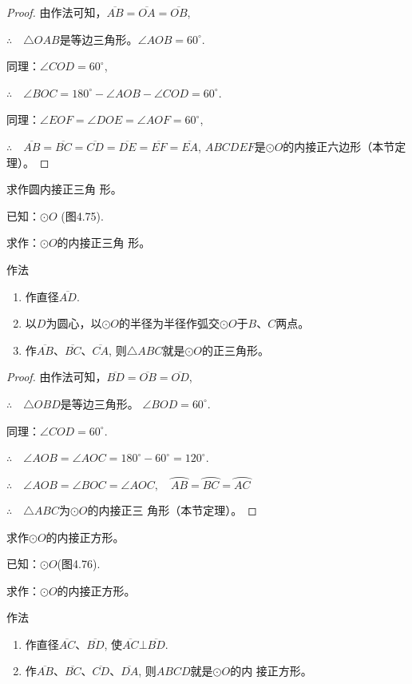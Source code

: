 \begin{proof}
由作法可知，$\overline{AB}=\overline{OA}=\overline{OB}$, 

$\therefore\quad \triangle OAB$是等边三角形。$\angle AOB=60^{\circ}$.

同理：$\angle COD=60^{\circ}$,

$\therefore\quad \angle BOC=180^{\circ}-\angle AOB-\angle COD=60^{\circ}$.

同理：$\angle EOF=\angle DOE=\angle AOF=60^{\circ}$, 

$\therefore\quad \overline{AB}=\overline{BC}=\overline{CD}=\overline{DE}=\overline{EF}=\overline{EA}$, 
$ABCDEF$是$\odot O$的内接正六边形（本节定理）。
\end{proof}

\begin{example}
  求作圆内接正三角
  形。

  已知：$\odot O$ (图4.75).

  求作：$\odot O$的内接正三角
  形。

  作法
\begin{enumerate}
  \item 作直径$\overline{AD}$.
  \item 以$D$为圆心，以$\odot O$的半径为半径作弧交$\odot O$于$B$、$C$两点。
  \item 作$\overline{AB}$、$\overline{BC}$、$\overline{CA}$, 则$\triangle ABC$就是$\odot O$的正三角形。
\end{enumerate}
\end{example}

\begin{proof}
  由作法可知，$\overline{BD}=\overline{OB}=\overline{OD}$,

$\therefore\quad  \triangle OBD$是等边三角形。 $\angle BOD=60^{\circ}$.

  同理：$\angle COD=60^{\circ}$.

$\therefore\quad \angle AOB=\angle AOC=180^{\circ}-60^{\circ}=120^{\circ}$.

$\therefore\quad \angle AOB=\angle BOC=\angle AOC,\quad \wideparen{AB}=\wideparen{BC}=\wideparen{AC}$

$\therefore\quad \triangle ABC$为$\odot O$的内接正三
  角形（本节定理）。
\end{proof}

\begin{example}
  求作$\odot O$的内接正方形。

  已知：$\odot O$(图4.76).
  
  求作：$\odot O$的内接正方形。

  作法
\begin{enumerate}
  \item 作直径$\overline{AC}$、$\overline{BD}$, 使$\overline{AC}\bot \overline{BD}$.
  \item 作$\overline{AB}$、$\overline{BC}$、$\overline{CD}$、$\overline{DA}$, 则$ABCD$就是$\odot O$的内
  接正方形。
\end{enumerate}
\end{example}

